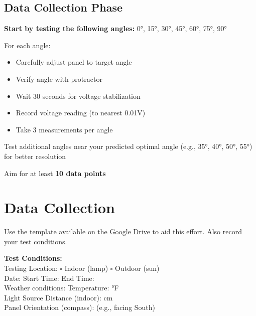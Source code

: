 \documentclass[11pt,twoside]{article}
\numberwithin{equation}{section}
\newcommand{\?}{\stackrel{?}{=}}
\begin{document}
\subsection*{Data Collection Phase}
\begin{compactenum} 
    \item \textbf{Start by testing the following angles:} 0°, 15°, 30°, 45°, 60°, 75°, 90°
    \item For each angle:
        \begin{itemize}
            \item Carefully adjust panel to target angle
            \item Verify angle with protractor
            \item Wait 30 seconds for voltage stabilization
            \item Record voltage reading (to nearest 0.01V)
            \item Take 3 measurements per angle
        \end{itemize}
    \item Test additional angles near your predicted optimal angle (e.g., 35°, 40°, 50°, 55°) for better resolution
    \item Aim for at least \textbf{10 data points}
\end{compactenum}



\section{Data Collection}
Use the template available on the \href{https://docs.google.com/spreadsheets/d/1xzCwlZFZiuBnjWweli-kPffb8hIk4uqAKPxgxIRLT9U/edit?usp=sharing}{Google Drive} to aid this effort.
Also record your test conditions.

\medskip

\noindent \textbf{Test Conditions:}\\
Testing Location: $\square$ Indoor (lamp) \quad $\square$ Outdoor (sun)\\
Date: \underline{\hspace{2cm}} \quad Start Time: \underline{\hspace{1.5cm}} \quad End Time: \underline{\hspace{1.5cm}}\\
Weather conditions: \underline{\hspace{3cm}} \quad Temperature: \underline{\hspace{1.5cm}}°F\\
Light Source Distance (indoor): \underline{\hspace{2cm}} cm\\
Panel Orientation (compass): \underline{\hspace{3cm}} (e.g., facing South)
\end{document}
